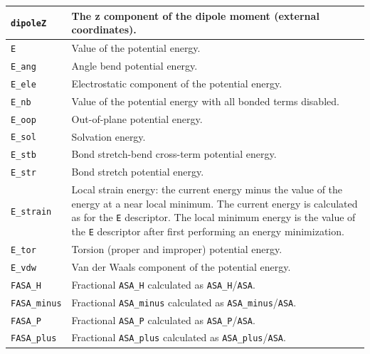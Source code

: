 \documentclass[12pt,a4paper]{article}
\begin{document}
\begin{longtable}{@{\zz}|p{}|p{}|}
\texttt{dipoleZ} & The z component of the dipole moment (external coordinates).\\ 
\hline

\texttt{E} & Value of the potential energy.\\ \hline

\texttt{E\_ang} & Angle bend potential energy.\\ \hline

\texttt{E\_ele} & Electrostatic component of the potential energy.\\ \hline

\texttt{E\_nb} & Value of the potential energy with all bonded terms disabled.\\ 
\hline

\texttt{E\_oop} & Out-of-plane potential energy.\\ \hline

\texttt{E\_sol} & Solvation energy.\\ \hline

\texttt{E\_stb} & Bond stretch-bend cross-term potential energy.\\ \hline

\texttt{E\_str} & Bond stretch potential energy.\\ \hline

\texttt{E\_strain} & Local strain energy: the current energy minus the value 
of the energy at a near local minimum. The current energy is calculated as for 
the \texttt{E} descriptor. The local minimum energy is the value of the 
\texttt{E} descriptor after first performing an energy minimization.\\ \hline

\texttt{E\_tor} & Torsion (proper and improper) potential energy.\\ \hline

\texttt{E\_vdw} & Van der Waals component of the potential energy.\\ \hline

\texttt{FASA\_H} & Fractional \texttt{ASA\_H} calculated as 
\texttt{ASA\_H}/\texttt{ASA}.\\ \hline

\texttt{FASA\_minus} & Fractional \texttt{ASA\_minus} calculated as 
\texttt{ASA\_minus}/\texttt{ASA}.\\ \hline

\texttt{FASA\_P} & Fractional \texttt{ASA\_P} calculated as 
\texttt{ASA\_P}/\texttt{ASA}.\\ \hline

\texttt{FASA\_plus} & Fractional \texttt{ASA\_plus} calculated as 
\texttt{ASA\_plus}/\texttt{ASA}.\\ \hline


\end{longtable}
\end{document}
